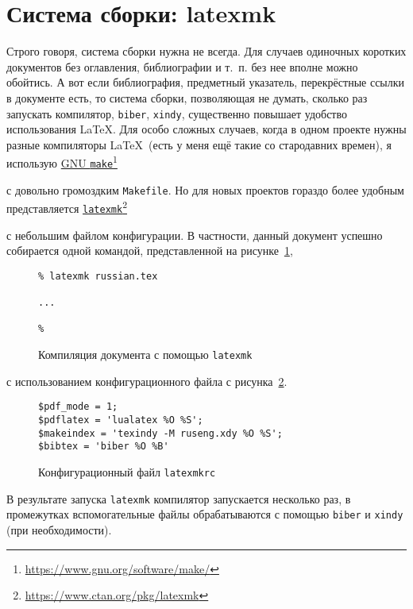 \documentclass[a4paper,12pt]{article}
\newcommand\foothref[2]{%
  \href{#1}{#2}\footnote{\url{#1}}%
}
\newcommand\exe[1]{\texttt{#1}}
\newcommand\file[1]{\texttt{#1}}
\begin{document}
\section{Система сборки: latexmk}
Строго говоря, система сборки нужна не всегда. Для случаев одиночных коротких
документов без оглавления, библиографии и т.~п. без нее вполне можно
обойтись. А вот если библиография, предметный указатель, перекрёстные
ссылки в документе есть, то система сборки, позволяющая не думать, сколько
раз запускать компилятор, \exe{biber}, \exe{xindy}, существенно
повышает удобство использования \LaTeX. Для особо сложных случаев, когда
в одном проекте нужны разные компиляторы \LaTeX\ (есть у меня ещё такие со
стародавних времен), я использую
\foothref{https://www.gnu.org/software/make/}{GNU \exe{make}}
с довольно громоздким \file{Makefile}. Но для новых проектов гораздо
более удобным представляется
\foothref{https://www.ctan.org/pkg/latexmk}{\exe{latexmk}}
с небольшим файлом конфигурации. В частности, данный документ успешно
собирается одной командой, представленной на рисунке~\ref{latexmk1},
\begin{figure}[tp]
\begin{tcolorbox}
\footnotesize
\begin{verbatim}
% latexmk russian.tex

...

%
\end{verbatim}
\end{tcolorbox}
\caption{Компиляция документа с помощью \exe{latexmk}}\label{latexmk1}
\end{figure}
с использованием конфигурационного файла с рисунка~\ref{latexmk2}.
\begin{figure}[tp]
\begin{tcolorbox}
\footnotesize
\begin{verbatim}
$pdf_mode = 1;
$pdflatex = 'lualatex %O %S';
$makeindex = 'texindy -M ruseng.xdy %O %S';
$bibtex = 'biber %O %B'
\end{verbatim}
\end{tcolorbox}
\caption{Конфигурационный файл \file{latexmkrc}}\label{latexmk2}
\end{figure}
В результате запуска \exe{latexmk} компилятор запускается несколько раз,
в промежутках вспомогательные файлы обрабатываются с помощью \exe{biber}
и \exe{xindy} (при необходимости).
\end{document}
